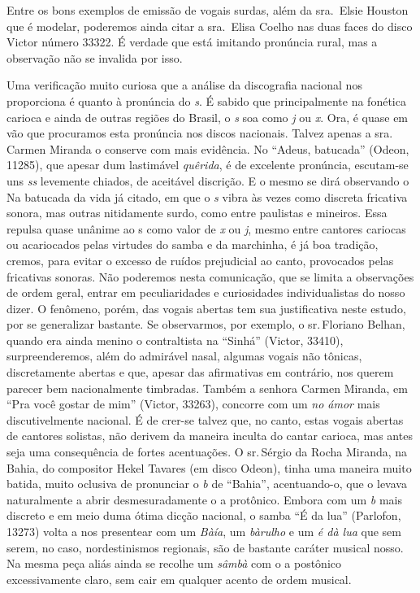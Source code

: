 Entre os bons exemplos de emissão de vogais surdas, além da sra.\, Elsie
Houston que é modelar, poderemos ainda citar a sra.\, Elisa Coelho nas
duas faces do disco Victor número 33322. É verdade que está imitando
pronúncia rural, mas a observação não se invalida por isso.

Uma verificação muito curiosa que a análise da discografia nacional nos
proporciona é quanto à pronúncia do \textit{s}. É sabido que principalmente na
fonética carioca e ainda de outras regiões do Brasil, o \textit{s} soa como \textit{j} ou
\textit{x}. Ora, é quase em vão que procuramos esta pronúncia nos discos
nacionais. Talvez apenas a sra.\, Carmen Miranda o conserve com mais
evidência. No ``Adeus, batucada'' (Odeon, 11285), que apesar dum lastimável
\textit{quêrida}, é de excelente pronúncia, escutam-se uns \textit{ss} levemente
chiados, de aceitável discrição. E o mesmo se dirá observando o Na
batucada da vida já citado, em que o \textit{s} vibra às vezes como discreta
fricativa sonora, mas outras nitidamente surdo, como entre paulistas e
mineiros. Essa repulsa quase unânime ao s como valor de \textit{x} ou \textit{j}, mesmo
entre cantores cariocas ou acariocados pelas virtudes do samba e da
marchinha, é já boa tradição, cremos, para evitar o excesso de ruídos
prejudicial ao canto, provocados pelas fricativas sonoras. Não poderemos
nesta comunicação, que se limita a observações de ordem geral, entrar em
peculiaridades e curiosidades individualistas do nosso dizer. O
fenômeno, porém, das vogais abertas tem sua justificativa neste estudo,
por se generalizar bastante. Se observarmos, por exemplo, o sr.\,Floriano
Belhan, quando era ainda menino o contraltista na ``Sinhá'' (Victor,
33410), surpreenderemos, além do admirável nasal, algumas vogais não
tônicas, discretamente abertas e que, apesar das afirmativas em
contrário, nos querem parecer bem nacionalmente timbradas. Também a
senhora Carmen Miranda, em ``Pra você gostar de mim'' (Victor, 33263),
concorre com um \textit{no ámor} mais discutivelmente nacional. É de crer-se
talvez que, no canto, estas vogais abertas de cantores solistas, não
derivem da maneira inculta do cantar carioca, mas antes seja uma
consequência de fortes acentuações. O sr.\,Sérgio da Rocha Miranda, na
Bahia, do compositor Hekel Tavares (em disco Odeon), tinha uma maneira
muito batida, muito oclusiva de pronunciar o \textit{b} de ``Bahia'',
acentuando-o, que o levava naturalmente a abrir desmesuradamente o a
protônico. Embora com um \textit{b} mais discreto e em meio duma ótima dicção
nacional, o samba ``É da lua'' (Parlofon, 13273) volta a nos presentear
com um \textit{Bàía}, um \textit{bàrulho} e um \textit{é dà lua} que sem serem, no
caso, nordestinismos regionais, são de bastante caráter musical nosso.
Na mesma peça aliás ainda se recolhe um \textit{sâmbà} com o a postônico
excessivamente claro, sem cair em qualquer acento de ordem musical.

